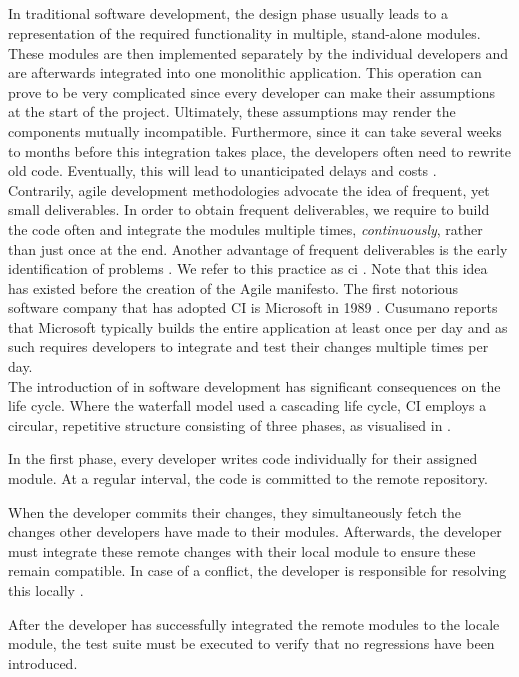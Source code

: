
\subsection{\CI}
In traditional software development, the design phase usually leads to a representation of the required functionality in multiple, stand-alone modules. These modules are then implemented separately by the individual developers and are afterwards integrated into one monolithic application. This operation can prove to be very complicated since every developer can make their assumptions at the start of the project. Ultimately, these assumptions may render the components mutually incompatible. Furthermore, since it can take several weeks to months before this integration takes place, the developers often need to rewrite old code. Eventually, this will lead to unanticipated delays and costs \cite{SmartJenkinsDefinitive}.\\

\noindent Contrarily, agile development methodologies advocate the idea of frequent, yet small deliverables. In order to obtain frequent deliverables, we require to build the code often and integrate the modules multiple times, \emph{continuously}, rather than just once at the end. Another advantage of frequent deliverables is the early identification of problems \cite{gitlabci}. We refer to this practice as \acrfull{ci} \cite{SmartJenkinsDefinitive}. Note that this idea has existed before the creation of the Agile manifesto. The first notorious software company that has adopted CI is Microsoft in 1989 \cite{cusumanomicrosoft}. Cusumano reports that Microsoft typically builds the entire application at least once per day and as such requires developers to integrate and test their changes multiple times per day.\\

\noindent The introduction of \CI{} in software development has significant consequences on the life cycle. Where the waterfall model used a cascading life cycle, CI employs a circular, repetitive structure consisting of three phases, as visualised in .

\begin{enumerate}
	 In the first phase, every developer writes code individually for their assigned module. At a regular interval, the code is committed to the remote repository.
	
	 When the developer commits their changes, they simultaneously fetch the changes other developers have made to their modules. Afterwards, the developer must integrate these remote changes with their local module to ensure these remain compatible. In case of a conflict, the developer is responsible for resolving this locally \cite{martin2014}.
	
	 After the developer has successfully integrated the remote modules to the locale module, the test suite must be executed to verify that no regressions have been introduced.
\end{enumerate}

